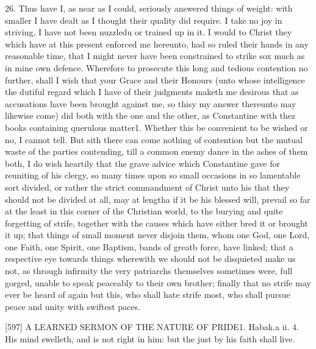 26. Thus have I, as near as I could, seriously answered things of weight: with smaller I have dealt as I thought their quality did require. I take no joy in striving, I have not been nuzzledu or trained up in it. I would to Christ they which have at this present enforced me hereunto, had so ruled their hands in any reasonable time, that I might never have been constrained to strike sox much as in mine own defence. Wherefore to prosecute this long and tedious contention no further, shall I wish that your Grace and their Honours (unto whose intelligence the dutiful regard which I have of their judgments maketh me desirous that as accusations have been brought against me, so thisy my answer thereunto may likewise come) did both with the one and the other, as Constantine with thez books containing querulous matter1. Whether this be convenient to be wished or no, I cannot tell. But sith there can come nothing of contention but the mutual waste of the parties contending, till a common enemy dance in the ashes of them both, I do wish heartily that the grave advice which Constantine gave for reuniting of his clergy, so many times upon so small occasions in so lamentable sort divided, or rather the strict commandment of Christ unto his that they should not be divided at all, may at lengtha if it be his blessed will, prevail so far at the least in this corner of the Christian world, to the burying and quite forgetting of strife, together with the causes which have either bred it or brought it up; that things of small moment never disjoin them, whom one God, one Lord, one Faith, one Spirit, one Baptism, bands of greatb force, have linked; that a respective eye towards things wherewith we should not be disquieted make us not, as through infirmity the very patriarchs themselves sometimes were, full gorged, unable to speak peaceably to their own brother; finally that no strife may ever be heard of again but this, who shall hate strife most, who shall pursue peace and unity with swiftest paces.

[597]
A LEARNED SERMON OF THE NATURE OF PRIDE1.
Habak.a ii. 4.
His mind swelleth, and is not right in him: but the just by his faith shall live.

